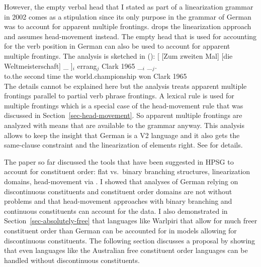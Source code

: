 \documentclass[output=paper]{langsci/langscibook}
\begin{document}
However, the empty verbal head that I stated as part of a linearization grammar in 2002 comes as a stipulation since its
only purpose in the grammar of German was to account for apparent multiple
frontings. \citet{Mueller2005d,MuellerGS} drops the linearization approach and assumes head-movement
instead. The empty head that is used for accounting for the verb position in German can also be used
to account for apparent multiple frontings. The analysis is sketched in ():
\ea
\label{ex-zum-zweiten-anal-zwei}%
\gll {}[ [Zum zweiten Mal] [die Weltmeisterschaft] \_ ]$_i$ errang$_j$ Clark 1965 \_$_i$ \_$_j$.\\
      {}         \spacebr{}to.the second time \spacebr{}the world.championship {} {} won Clark 1965\\
\z 
The details cannot be explained here but the analysis treats apparent multiple frontings parallel to
partial verb phrase frontings. A lexical rule is used for multiple frontings which is a special case
of the head-movement rule that was discussed in Section~\ref{sec-head-movement}. So apparent
multiple frontings are analyzed with means that are available to the grammar anyway. This analysis
allows to keep the insight that German is a V2 language and it also gets the same-clause constraint
and the linearization of elements right. See  for details.




The paper so far discussed the tools that have been suggested in HPSG to account for constituent
order: flat vs.\ binary branching structures, linearization domains, head-movement via \dsl. I
showed that analyses of German relying on discontinuous constituents and constituent order domains
are not without problems and that head-movement approaches with binary branching and continuous
constituents can account for the data. I also demonstrated in Section~\ref{sec-absolutely-free} that
languages like Warlpiri that allow for much freer constituent order than German can be accounted
for in models allowing for discontinuous constituents. The following section discusses a proposal by \citet{Bender2008a} showing that even
languages like the Australian free constituent order languages can be handled without discontinuous constituents.
\end{document}
